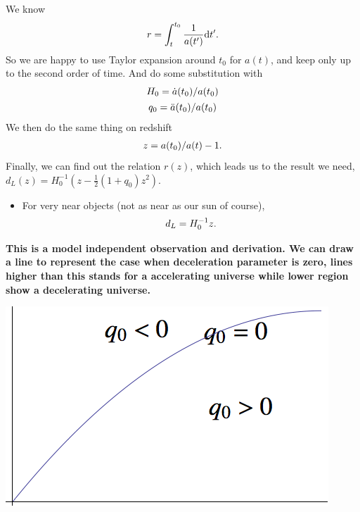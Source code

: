 \documentclass[letterpaper,10pt,english]{sphinxmanual}
\begin{document}
We know
\begin{gather}
\begin{split}r = \int_t^{t_0} \frac{1}{a(t')} \mathrm d t' .\end{split}\notag
\end{gather}
So we are happy to use Taylor expansion around \(t_0\) for \(a(t)\), and keep only up to the second order of time. And do some substitution with
\begin{gather}
\begin{split}H_0 = \dot a(t_0)/a(t_0)\end{split}\notag\\\begin{split}q_0=\ddot a (t_0) / a(t_0)\end{split}\notag
\end{gather}
We then do the same thing on redshift
\begin{gather}
\begin{split}z=a(t_0)/a(t) - 1 .\end{split}\notag
\end{gather}
Finally, we can find out the relation \(r(z)\), which leads us to the result we need, \(d_L(z) = H_0^{-1} (z - \frac12 (1+q_0) z^2)\).
\begin{itemize}
\item {} 
For very near objects (not as near as our sun of course),
\begin{gather}
\begin{split}d_L = H_0^{-1}z .\end{split}\notag
\end{gather}
\end{itemize}

\textbf{This is a model independent observation and derivation. We can draw a line to represent the case when deceleration parameter is zero, lines higher than this stands for a accelerating universe while lower region show a decelerating universe.}

\includegraphics{LuminosityDistanceVSRedshift.png}
\end{document}
